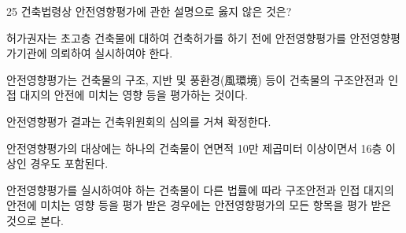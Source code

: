 \begin{question}{25}
건축법령상 안전영향평가에 관한 설명으로 옳지 않은 것은?
\begin{choices}
  \item 허가권자는 초고층 건축물에 대하여 건축허가를 하기 전에 안전영향평가를 안전영향평가기관에 의뢰하여 실시하여야 한다.
  \item 안전영향평가는 건축물의 구조, 지반 및 풍환경(風環境) 등이 건축물의 구조안전과 인접 대지의 안전에 미치는 영향 등을 평가하는 것이다.
  \item 안전영향평가 결과는 건축위원회의 심의를 거쳐 확정한다.
  \item 안전영향평가의 대상에는 하나의 건축물이 연면적 10만 제곱미터 이상이면서 16층 이상인 경우도 포함된다.
  \item 안전영향평가를 실시하여야 하는 건축물이 다른 법률에 따라 구조안전과 인접 대지의 안전에 미치는 영향 등을 평가 받은 경우에는 안전영향평가의 모든 항목을 평가 받은 것으로 본다.
\end{choices}
\end{question}
